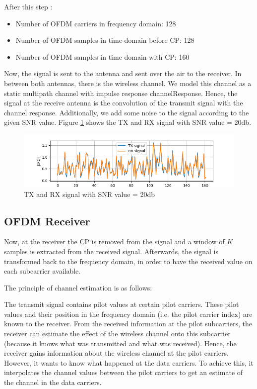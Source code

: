 After this step :
\begin{itemize}
    \item Number of OFDM carriers in frequency domain: 128
    \item Number of OFDM samples in time-domain before CP: 128
    \item Number of OFDM samples in time domain with CP: 160
\end{itemize}

Now, the signal is sent to the antenna and sent over the air to the receiver. In between both antennas, there is the wireless channel. We model this channel as a static multipath channel with impulse response channelResponse. Hence, the signal at the receive antenna is the convolution of the transmit signal with the channel response. Additionally, we add some noise to the signal according to the given SNR value. Figure \ref{tx_rx} shows the TX and RX signal with SNR value = 20db.

\begin{figure}[htbp]
    \centering
    \includegraphics[width=\textwidth]{../Source/results/tx_rx.png}
    \caption{TX and RX signal with SNR value = 20db}
    \label{tx_rx}
\end{figure}

\subsection{OFDM Receiver}

Now, at the receiver the CP is removed from the signal and a window of $K$ samples is extracted from the received signal. Afterwards, the signal is transformed back to the frequency domain, in order to have the received value on each subcarrier available.

The principle of channel estimation is as follows:

The transmit signal contains pilot values at certain pilot carriers. These pilot values and their position in the frequency domain (i.e. the pilot carrier index) are known to the receiver. From the received information at the pilot subcarriers, the receiver can estimate the effect of the wireless channel onto this subcarrier (because it knows what was transmitted and what was received). Hence, the receiver gains information about the wireless channel at the pilot carriers. However, it wants to know what happened at the data carriers. To achieve this, it interpolates the channel values between the pilot carriers to get an estimate of the channel in the data carriers.

